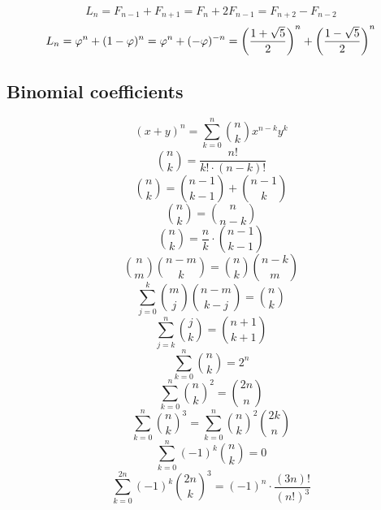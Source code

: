 \documentclass[11.5pt,a4paper,landscape,oneside]{amsart}
\newcommand{\Sequence}[1]{\subsection{#1}}
\begin{document}
\begin{multicols*}{2}
	\begin{equation}
		L_n = F_{n-1}+F_{n+1}=F_n+2F_{n-1} = F_{n+2}-F_{n-2}
	\end{equation}
	\begin{equation}
		L_n = \varphi^n + (1-\varphi)^{n} = \varphi^n + (- \varphi)^{-n}=\left({ 1+ \sqrt{5} \over 2}\right)^n + \left({ 1- \sqrt{5} \over 2}\right)^n
	\end{equation}
	\Sequence{Binomial coefficients}
	\begin{equation}
		(x+y)^n=\sum_{k=0}^n\binom{n}{k} x^{n-k}y^k
	\end{equation}
	\begin{equation}
		\binom{n}{k} = \frac{n!}{k!\cdot(n-k)!}
	\end{equation}
	\begin{equation}
		\binom{n}{k} = \binom{n-1}{k-1} + \binom{n-1}{k}
	\end{equation}
	\begin{equation}
		\binom{n}{k} = \binom{n}{n-k}
	\end{equation}
	\begin{equation}
		\binom{n}{k} = \frac{n}{k}\cdot\binom{n-1}{k-1}
	\end{equation}
	\begin{equation}
		\binom{n}{m}\binom{n-m}{k}=\binom{n}{k}\binom{n-k}{m}
	\end{equation}
	\begin{equation}
		\sum_{j=0}^k\binom{m}{j}\binom{n-m}{k-j}=\binom{n}{k}
	\end{equation}
	\begin{equation}
		\sum_{j=k}^n\binom{j}{k}=\binom{n+1}{k+1}
	\end{equation}
	\begin{equation}
		\sum_{k=0}^n \binom{n}{k} = 2^n
	\end{equation}
	\begin{equation}
		\sum_{k=0}^n \binom{n}{k}^2 = \binom{2n}{n}
	\end{equation}
	\begin{equation}
		\sum_{k=0}^n\binom{n}{k}^3=\sum_{k=0}^n\binom{n}{k}^2\binom{2k}n
	\end{equation}
	\begin{equation}
		\sum_{k=0}^n (-1)^k\binom{n}{k} = 0
	\end{equation}
	\begin{equation}
		\sum_{k=0}^{2n}(-1)^k\binom{2n}{k}^3=(-1)^n\cdot\frac{(3n)!}{(n!)^3}
	\end{equation}
	\begin{equation}

\end{equation}
\end{multicols*}
\end{document}
